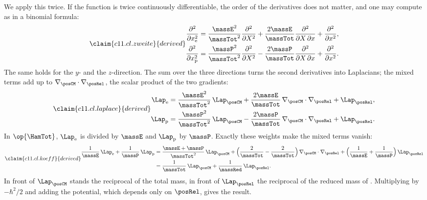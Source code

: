 We apply this twice. If the function is twice continuously differentiable, the order of
the derivatives does not matter, and one may compute as in a binomial formula:
\begin{equation}\label{c11.eq.zweite}\claim{c11.cl.zweite}{derived}
  \begin{aligned}
    \frac{\partial^2}{\partial x_{\mathrm{e}}^2}
    &= \frac{\massE^2}{\massTot^2}\frac{\partial^2}{\partial X^2}
     + \frac{2\massE}{\massTot}\frac{\partial^2}{\partial X\,\partial x}
     + \frac{\partial^2}{\partial x^2}, \\
    \frac{\partial^2}{\partial x_{\mathrm{p}}^2}
    &= \frac{\massP^2}{\massTot^2}\frac{\partial^2}{\partial X^2}
     - \frac{2\massP}{\massTot}\frac{\partial^2}{\partial X\,\partial x}
     + \frac{\partial^2}{\partial x^2}.
  \end{aligned}
\end{equation}
The same holds for the $y$- and the $z$-direction. The sum over the three directions
turns the second derivatives into Laplacians; the mixed terms add up to
$\nabla_{\posCM} \cdot \nabla_{\posRel}$, the scalar product of the two gradients:
\begin{equation}\label{c11.eq.laplace}\claim{c11.cl.laplace}{derived}
  \begin{aligned}
    \Lap_{\mathrm{e}}
    &= \frac{\massE^2}{\massTot^2}\,\Lap_{\posCM}
     + \frac{2\massE}{\massTot}\,\nabla_{\posCM} \cdot \nabla_{\posRel}
     + \Lap_{\posRel}, \\
    \Lap_{\mathrm{p}}
    &= \frac{\massP^2}{\massTot^2}\,\Lap_{\posCM}
     - \frac{2\massP}{\massTot}\,\nabla_{\posCM} \cdot \nabla_{\posRel}
     + \Lap_{\posRel}.
  \end{aligned}
\end{equation}
In $\op{\HamTot}$, $\Lap_{\mathrm{e}}$ is divided by $\massE$ and $\Lap_{\mathrm{p}}$ by
$\massP$. Exactly these weights make the mixed terms vanish:
\begin{equation}\label{c11.eq.koeff}\claim{c11.cl.koeff}{derived}
  \begin{aligned}
    \frac{1}{\massE}\,\Lap_{\mathrm{e}} + \frac{1}{\massP}\,\Lap_{\mathrm{p}}
    &= \frac{\massE + \massP}{\massTot^2}\,\Lap_{\posCM}
     + \Bigl(\frac{2}{\massTot} - \frac{2}{\massTot}\Bigr)\,
       \nabla_{\posCM} \cdot \nabla_{\posRel}
     + \Bigl(\frac{1}{\massE} + \frac{1}{\massP}\Bigr)\,\Lap_{\posRel} \\
    &= \frac{1}{\massTot}\,\Lap_{\posCM} + \frac{1}{\massRed}\,\Lap_{\posRel}.
  \end{aligned}
\end{equation}
In front of $\Lap_{\posCM}$ stands the reciprocal of the total mass, in front of
$\Lap_{\posRel}$ the reciprocal of the reduced mass of . Multiplying by
$-\hbar^2/2$ and adding the potential, which depends only on $\posRel$, gives the result.

